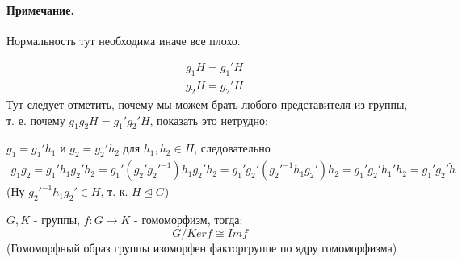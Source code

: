 \paragraph{Примечание.} Нормальность тут необходима иначе все плохо.

\[
	\begin{split}
		& g_1 H = g_1' H \\
		& g_2 H = g_2' H
	\end{split}
\]
Тут следует отметить, почему мы можем брать любого представителя из группы, т. е. почему $g_1 g_2 H = g_1' g_2' H$, показать это нетрудно:

$g_1 = g_1' h_1$ и $g_2 = g_2' h_2$ для $h_1, h_2 \in H$, следовательно
\[
	\begin{split}
		g_1 g_2 = g_1'h_1 g_2'h_2 = g_1' \left(g_2'{g_2'}^{-1}\right) h_1 g_2' h_2 = g_1'g_2' \left({g_2'}^{-1}h_1g_2'\right) h_2 = g_1'g_2'h_1'h_2 = g_1'g_2' \tilde h
	\end{split}
\]
(Ну ${g_2'}^{-1}h_1g_2' \in H$, т. к. $H \trianglelefteq G$)

\begin{Th}
$G,K$ - группы, $f: G \rightarrow K$ - гомоморфизм, тогда:
\[
	G / {Ker f} \cong Im f
\]
(Гомоморфный образ группы изоморфен факторгруппе по ядру гомоморфизма)
\end{Th}
